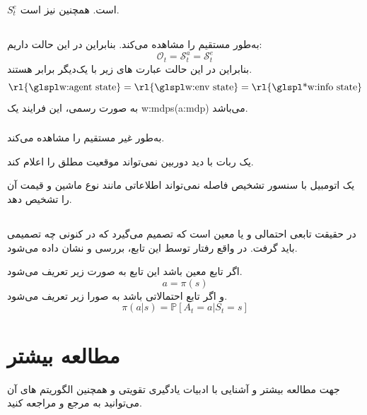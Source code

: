 \begin{remark}
	 $S_t^e$   است.
	همچنین 
	 نیز  است.
\end{remark}


\subsection{}

\subsubsection{}

به‌طور مستقیم  را مشاهده می‌کند. بنابراین در این حالت داریم:
	\[
		\mathcal{O}_t = \mathcal{S}_t^a = \mathcal{S}_t^e
	\]
بنابراین در این حالت عبارت های زیر با یک‌دیگر برابر هستند.
	\[
	\text{\rl{\w{agent state}}} = \text{\rl{\w{env state}}} = \text{\rl{\ws{info state}}}
	\]
به صورت رسمی، این فرایند یک \Glspl{w:mdp}(\gls*{a:mdp}) می‌باشد.
\cite{Sutton1998}
	

\subsubsection{}
 به‌طور غیر مستقیم  را مشاهده می‌کند.
\begin{example}
			یک ربات با دید دوربین نمی‌تواند موقعیت مطلق را اعلام کند.		
\end{example}
\begin{example}
	یک اتومبیل با سنسور تشخیص فاصله نمی‌تواند اطلاعاتی مانند نوع ماشین و قیمت آن را تشخیص دهد.
\end{example}

\subsection{}
در حقیقت تابعی احتمالی و یا معین است که تصمیم می‌گیرد که در  کنونی چه تصمیمی باید گرفت. در واقع رفتار  توسط این تابع، بررسی و نشان داده می‌شود.

\begin{definition}
	اگر تابع معین باشد این تابع به صورت زیر تعریف می‌شود.
$$
a = \pi(s)
$$
و اگر تابع احتمالاتی باشد به صورا زیر تعریف می‌شود.
$$
\pi(a | s)=\mathbb{P}\left[A_{t}=a | S_{t}=s\right]
$$
\end{definition}


\section{مطالعه بیشتر}
جهت مطالعه بیشتر و آشنایی با ادبیات یادگیری تقویتی و همچنین الگوریتم های آن می‌توانید به مرجع  \cite{Sutton1998} و \cite{uclRL}
مراجعه کنید.



